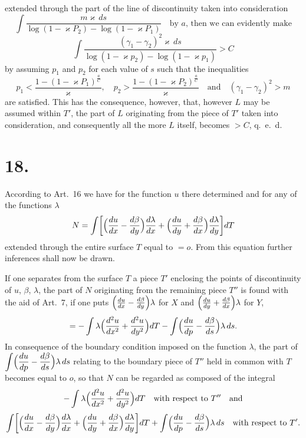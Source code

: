 \documentclass{article}
\begin{document}
extended through the part of the line of discontinuity taken into consideration
\[
\int \frac{m\varkappa\,ds}{\log(1 - \varkappa P_2) - \log(1 - \varkappa P_1)} \quad \text{by } a\text{, then we can evidently make}
\]
\[
\int \frac{(\gamma_1 - \gamma_2)^2 \varkappa\,ds}{\log(1 - \varkappa p_2) - \log(1 - \varkappa p_1)} > C
\]
by assuming $p_1$ and $p_2$ for each value of $s$ such that the inequalities
\[
p_1 < \frac{1 - (1 - \varkappa P_1)^{\frac{a}{C}}}{\varkappa}, \quad p_2 > \frac{1 - (1 - \varkappa P_2)^{\frac{a}{C}}}{\varkappa} \quad \text{and} \quad (\gamma_1 - \gamma_2)^2 > m
\]
are satisfied. This has the consequence, however, that, however $L$ may be assumed within $T'$, the part of $L$ originating from the piece of $T'$ taken into consideration, and consequently all the more $L$ itself, becomes $> C$, q.\ e.\ d.

\section*{18.}

According to Art.~16 we have for the function $u$ there determined and for any of the functions $\lambda$
\[
N = \int \biggl[\Bigl(\frac{du}{dx} - \frac{d\beta}{dy}\Bigr)\frac{d\lambda}{dx} + \Bigl(\frac{du}{dy} + \frac{d\beta}{dx}\Bigr)\frac{d\lambda}{dy}\biggr] dT
\]
extended through the entire surface $T$ equal to $= o$. From this equation further inferences shall now be drawn.

If one separates from the surface $T$ a piece $T'$ enclosing the points of discontinuity of $u$, $\beta$, $\lambda$, the part of $N$ originating from the remaining piece $T''$ is found with the aid of Art.~7, if one puts $\Bigl(\frac{du}{dx} - \frac{d\beta}{dy}\Bigr)\lambda$ for $X$ and $\Bigl(\frac{du}{dy} + \frac{d\beta}{dx}\Bigr)\lambda$ for $Y$,
\[
= -\int \lambda \Bigl(\frac{d^2u}{dx^2} + \frac{d^2u}{dy^2}\Bigr) dT - \int \Bigl(\frac{du}{dp} - \frac{d\beta}{ds}\Bigr)\lambda\,ds.
\]
In consequence of the boundary condition imposed on the function $\lambda$, the part of $\displaystyle\int \Bigl(\frac{du}{dp} - \frac{d\beta}{ds}\Bigr)\lambda\,ds$ relating to the boundary piece of $T''$ held in common with $T$ becomes equal to $o$, so that $N$ can be regarded as composed of the integral
\[
-\int \lambda \Bigl(\frac{d^2u}{dx^2} + \frac{d^2u}{dy^2}\Bigr) dT \quad \text{with respect to } T'' \quad \text{and}
\]
\[
\int \biggl[\Bigl(\frac{du}{dx} - \frac{d\beta}{dy}\Bigr)\frac{d\lambda}{dx} + \Bigl(\frac{du}{dy} + \frac{d\beta}{dx}\Bigr)\frac{d\lambda}{dy}\biggr] dT + \int \Bigl(\frac{du}{dp} - \frac{d\beta}{ds}\Bigr)\lambda\,ds \quad \text{with respect to } T'.
\]
\end{document}
